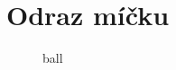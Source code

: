 \section{Odraz míčku}
\label{sec:odraz-micku}


\begin{figure}[htbp]
 \centering
 

 \caption{ball}
 \label{fig:ball}
\end{figure}
